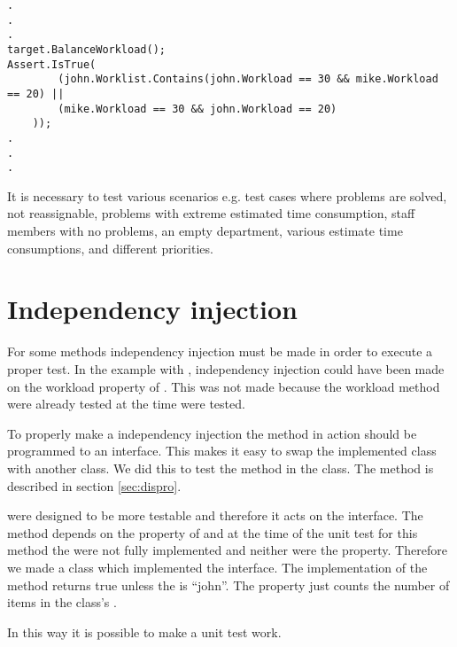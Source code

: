 \begin{lstlisting}[style=sourceCode, caption=\myCaption{An example unit test which tests a specific instance of the balanceWorkload method.}, label=lst:balanceWorkloadTestAssert]
.
.
.
target.BalanceWorkload();
Assert.IsTrue(
		(john.Worklist.Contains(john.Workload == 30 && mike.Workload == 20) || 
		(mike.Workload == 30 && john.Workload == 20)
	));
.
.
.
\end{lstlisting}

It is necessary to test various scenarios e.g. test cases where problems are solved, not reassignable, problems with extreme estimated time consumption, staff members with no problems, an empty department, various estimate time consumptions, and different priorities. 


\section{Independency injection}
\label{sec:independencyInjection}
For some methods independency injection must be made in order to execute a proper test. 
In the example with , independency injection could have been made on the workload property of . 
This was not made because the workload method were already tested at the time  were tested.

To properly make a independency injection the method in action should be programmed to an interface. 
This makes it easy to swap the implemented class with another class. 
We did this to test the method  in the  class. 
The method is described in section \ref{sec:dispro}.

 were designed to be more testable and therefore it acts on the  interface. 
The method depends on the  property of  and at the time of the unit test for this method the  were not fully implemented and neither were the  property. 
Therefore we made a  class which implemented the  interface.
The  implementation of the  method returns true unless the  is ``john''. 
The  property just counts the number of items in the  class's . 

In this way it is possible to make a unit test work. 

